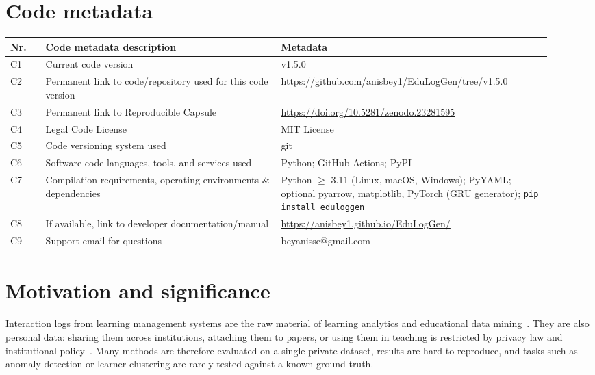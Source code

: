 \documentclass[preprint,12pt]{elsarticle}
\begin{document}
\section*{Code metadata}
\noindent
\begin{small}
\begin{tabular}{p{0.06\linewidth}p{0.40\linewidth}p{0.46\linewidth}}
\toprule
Nr. & Code metadata description & Metadata \\
\midrule
C1 & Current code version & v1.5.0 \\
C2 & Permanent link to code/repository used for this code version & \url{https://github.com/anisbey1/EduLogGen/tree/v1.5.0} \\
C3 & Permanent link to Reproducible Capsule & \url{https://doi.org/10.5281/zenodo.23281595} \\
C4 & Legal Code License & MIT License \\
C5 & Code versioning system used & git \\
C6 & Software code languages, tools, and services used & Python; GitHub Actions; PyPI \\
C7 & Compilation requirements, operating environments \& dependencies & Python $\geq$ 3.11 (Linux, macOS, Windows); PyYAML; optional pyarrow, matplotlib, PyTorch (GRU generator); \texttt{pip install eduloggen} \\
C8 & If available, link to developer documentation/manual & \url{https://anisbey1.github.io/EduLogGen/} \\
C9 & Support email for questions & beyanisse@gmail.com \\
\bottomrule
\end{tabular}
\end{small}

\section{Motivation and significance}

Interaction logs from learning management systems are the raw material of
learning analytics and educational data mining~\cite{romero2020edm}. They are
also personal data: sharing them across institutions, attaching them to
papers, or using them in teaching is restricted by privacy law and
institutional policy~\cite{drachsler2016delicate}. Many methods are therefore
evaluated on a single private dataset, results are hard to reproduce, and
tasks such as anomaly detection or learner clustering are rarely tested
against a known ground truth.
\end{document}
